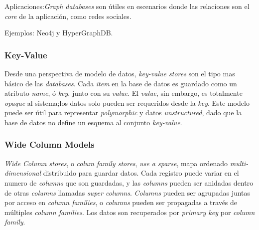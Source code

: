 Aplicaciones:\textit{Graph databases} son útiles en escenarios donde las relaciones son el \textit{core} de la aplicación, como redes sociales.

Ejemplos: Neo4j y HyperGraphDB.

\subsubsection{Key-Value}
\label{cap:justificacion_proyecto:base_datos:nosql:key_value}

Desde una perspectiva de modelo de datos, \textit{key-value stores} son el tipo mas básico de las \textit{ databases}. Cada \textit{item} en la base de datos es guardado como un atributo \textit{name}, ó \textit{key}, junto con su \textit{value}. El \textit{value}, sin embargo, es totalmente \textit{opaque} al sistema;los datos solo pueden ser requeridos desde la \textit{key}. Este modelo puede ser útil para representar \textit{polymorphic} y datos \textit{unstructured}, dado que la base de datos  no define un esquema al conjunto \textit{key-value}.

\subsubsection{Wide Column Models}
\label{cap:justificacion_proyecto:base_datos:nosql:wide_column_model}

\textit{Wide Column stores}, o \textit{colum family stores}, \textit{use a sparse}, mapa ordenado \textit{multi-dimensional} distribuido para guardar datos. Cada registro puede variar en el numero de \textit{columns} que son guardadas, y las \textit{columns} pueden ser anidadas dentro de otras \textit{columns} llamadas \textit{super columns}. \textit{Columns} pueden ser agrupadas juntas por acceso en \textit{column families}, o \textit{columns} pueden ser propagadas a través de múltiples \textit{column families}. Los datos son recuperados por \textit{primary key} por \textit{column family}.

